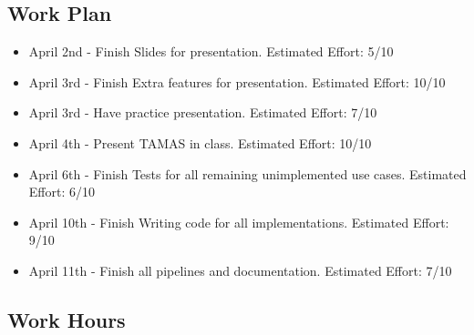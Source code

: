 \documentclass[12pt]{article}
\begin{document}
 \subsection{Work Plan}

\begin{itemize}
   \item April 2nd - Finish Slides for presentation. Estimated Effort: 5/10
   \item  April 3rd - Finish Extra features for presentation. Estimated Effort: 10/10
   \item  April 3rd - Have practice presentation. Estimated Effort: 7/10
   \item  April 4th - Present TAMAS in class. Estimated Effort: 10/10
   \item  April 6th - Finish Tests for all remaining unimplemented use cases. Estimated Effort: 6/10
   \item  April 10th - Finish Writing code for all implementations. Estimated Effort: 9/10
   \item April 11th - Finish all pipelines and documentation. Estimated Effort: 7/10
\end{itemize}

 \subsection{Work Hours}
\end{document}
